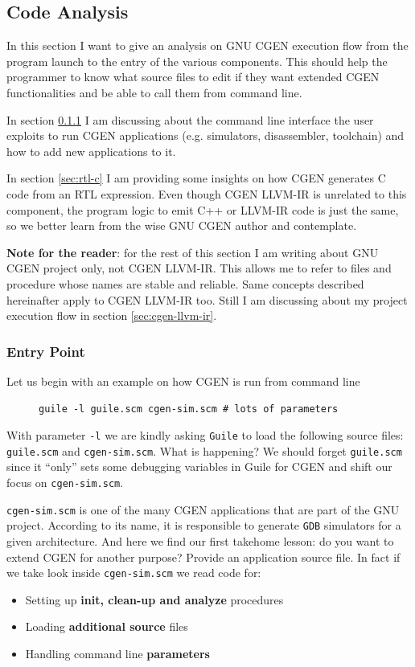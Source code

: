 \documentclass{article}
\begin{document}
\subsection{Code Analysis}
In this section I want to give an analysis on GNU CGEN execution flow from the program launch to the entry of the various components. This should help the programmer to know what source files to edit if they want extended CGEN functionalities and be able to call them from command line.

In section \ref{sec:entryPoint} I am discussing about the command line interface the user exploits to run CGEN applications (e.g. simulators, disassembler, toolchain) and how to add new applications to it.

In section \ref{sec:rtl-c} I am providing some insights on how CGEN generates C code from an RTL expression. Even though CGEN LLVM-IR is unrelated to this component, the program logic to emit C++ or LLVM-IR code is just the same, so we better learn from the wise GNU CGEN author and contemplate.

\textbf{Note for the reader}: for the rest of this section I am writing about GNU CGEN project only, not CGEN LLVM-IR. This allows me to refer to files and procedure whose names are stable and reliable. Same concepts described hereinafter apply to CGEN LLVM-IR too. Still I am discussing about my project execution flow in section \ref{sec:cgen-llvm-ir}.

\subsubsection{Entry Point} \label{sec:entryPoint}
Let us begin with an example on how CGEN is run from command line

\begin{figure}[H]
\begin{lstlisting}
guile -l guile.scm cgen-sim.scm # lots of parameters
\end{lstlisting}
\end{figure}

With parameter \texttt{-l} we are kindly asking \texttt{Guile} to load the following source files: \texttt{guile.scm} and \texttt{cgen-sim.scm}. What is happening? We should forget \texttt{guile.scm} since it ``only'' sets some debugging variables in Guile for CGEN and shift our focus on \texttt{cgen-sim.scm}. 

\texttt{cgen-sim.scm} is one of the many CGEN applications that are part of the GNU project. According to its name, it is responsible to generate \texttt{GDB} simulators for a given architecture. And here we find our first takehome lesson: do you want to extend CGEN for another purpose? Provide an application source file. In fact if we take look inside \texttt{cgen-sim.scm} we read code for:
\begin{itemize}
\item Setting up \textbf{init, clean-up and analyze} procedures
\item Loading \textbf{additional source} files
\item Handling command line \textbf{parameters}
\end{itemize}
\end{document}
